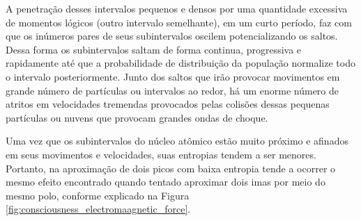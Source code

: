 A penetração desses intervalos pequenos e densos por uma quantidade excessiva de momentos lógicos (outro intervalo semelhante), em um curto período, faz com que os inúmeros pares de seus subintervalos oscilem potencializando os saltos. Dessa forma os subintervalos saltam de forma continua, progressiva e rapidamente até que a probabilidade de distribuição da população normalize todo o intervalo posteriormente. Junto dos saltos que irão provocar movimentos em grande número de partículas ou intervalos ao redor, há um enorme número de atritos em velocidades tremendas provocados pelas colisões dessas pequenas partículas ou nuvens que provocam grandes ondas de choque.

Uma vez que os subintervalos do núcleo atômico estão muito próximo e afinados em seus movimentos e velocidades, suas entropias tendem a ser menores. Portanto, na aproximação de dois picos com baixa entropia tende a ocorrer o mesmo efeito encontrado quando tentado aproximar dois imas por meio do mesmo polo, conforme explicado na Figura \ref{fig:consciousness_electromaagnetic_force}. 

